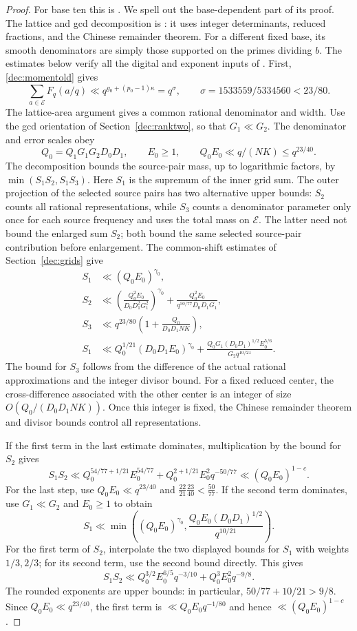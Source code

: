 \documentclass[11pt,a4paper]{article}
\theoremstyle{paperplain}
\numberwithin{equation}{section}
\begin{document}
\begin{proof}
For base ten this is \cite[Proposition 13.3]{Maynard2019}.
We spell out the base-dependent part of its proof.
The lattice and gcd decomposition is
\cite[Lemmas 14.1--14.3]{Maynard2019}: it uses integer determinants,
reduced fractions, and the Chinese remainder theorem.
For a different fixed base, its smooth denominators are simply those
supported on the primes dividing $b$.
The estimates below verify all the digital and exponent inputs of
\cite[Lemma 14.4]{Maynard2019}. First, \eqref{dec:momentold} gives
\[
 \sum_{a\in\mathcal E}F_q(a/q)
 \ll q^{g_0+(p_0-1)\kappa}=q^\sigma,\qquad
 \sigma=1533559/5334560<23/80.
\]
The lattice-area argument gives a common rational denominator and width.
Use the gcd orientation of Section~\ref{dec:ranktwo}, so that
$G_1\ll G_2$. The denominator and error scales obey
\[
 Q_0=Q_1G_1G_2D_0D_1,\qquad E_0\ge1,\qquad
 Q_0E_0\ll q/(NK)\le q^{23/40}.
\]
The decomposition bounds the source-pair mass, up to logarithmic
factors, by $\min(S_1S_2,S_1S_3)$.
Here $S_1$ is the supremum of the inner grid sum.
The outer projection of the selected source pairs has two alternative
upper bounds: $S_2$ counts all rational representations, while $S_3$
counts a denominator parameter only once for each source frequency
and uses the total mass on $\mathcal E$.
The latter need not bound the enlarged sum $S_2$; both bound the
same selected source-pair contribution before enlargement.
The common-shift estimates of Section~\ref{dec:grids} give
\begin{align*}
 S_1&\ll(Q_0E_0)^{\gamma_0},\\
 S_2&\ll\left(\frac{Q_0^2E_0}{D_0D_1^2G_1^2}\right)^{\gamma_0}
       +\frac{Q_0^2E_0}{q^{50/77}D_0D_1G_1},\\
 S_3&\ll q^{23/80}\left(1+\frac{Q_0}{D_0D_1NK}\right),\\
 S_1&\ll Q_0^{1/21}(D_0D_1E_0)^{\gamma_0}
       +\frac{Q_0G_1(D_0D_1)^{1/2}E_0^{5/6}}{G_2q^{10/21}}.
\end{align*}
The bound for $S_3$ follows from the difference of the actual rational
approximations and the integer divisor bound.
For a fixed reduced center, the cross-difference associated with the
other center is an integer of size $O(Q_0/(D_0D_1NK))$.
Once this integer is fixed, the Chinese remainder theorem and divisor
bounds control all representations.

If the first term in the last estimate dominates, multiplication
by the bound for $S_2$ gives
\[
 S_1S_2\ll
 Q_0^{54/77+1/21}E_0^{54/77}
 +Q_0^{2+1/21}E_0^2q^{-50/77}
 \ll(Q_0E_0)^{1-c}.
\]
For the last step, use $Q_0E_0\ll q^{23/40}$ and
$\frac{22}{21}\frac{23}{40}<\frac{50}{77}$.
If the second term dominates, use $G_1\ll G_2$ and $E_0\ge1$ to obtain
\[
 S_1\ll\min\left((Q_0E_0)^{\gamma_0},
          \frac{Q_0E_0(D_0D_1)^{1/2}}{q^{10/21}}\right).
\]
For the first term of $S_2$, interpolate the two displayed
bounds for $S_1$ with weights $1/3,2/3$; for its second term,
use the second bound directly. This gives
\[
 S_1S_2\ll Q_0^{3/2}E_0^{6/5}q^{-3/10}
                +Q_0^3E_0^2q^{-9/8}.
\]
The rounded exponents are upper bounds: in particular,
$50/77+10/21>9/8$.
Since $Q_0E_0\ll q^{23/40}$, the first term is
$\ll Q_0E_0q^{-1/80}$ and hence $\ll(Q_0E_0)^{1-c}$.


\end{proof}
\end{document}
